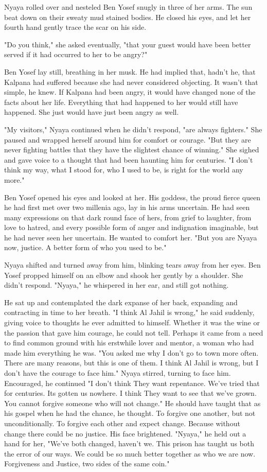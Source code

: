 \documentclass{amsart}
\begin{document}
Nyaya rolled over and nesteled Ben Yosef snugly in three of her arms. The sun beat down on their sweaty mud stained bodies. He closed his eyes, and let her fourth hand gently trace the scar on his side.

"Do you think," she asked eventually, "that your guest would have been better served if it had occurred to her to be angry?" 

Ben Yosef lay still, breathing in her musk. He had implied that, hadn't he, that Kalpana had suffered because she had never considered objecting. It wasn't that simple, he knew. If Kalpana had been angry, it would have changed none of the facts about her life. Everything that had happened to her would still have happened. She just would have just been angry as well.

"My visitors," Nyaya continued when he didn't respond, "are always fighters." She paused and wrapped herself around him for comfort or courage. "But they are never fighting battles that they have the slightest chance of winning." She sighed and gave voice to a thought that had been haunting him for centuries. "I don't think my way, what I stood for, who I used to be, is right for the world any more."

Ben Yosef opened his eyes and looked at her. His goddess, the proud fierce queen he had first met over two millenia ago, lay in his arms uncertain. He had seen many expressions on that dark round face of hers, from grief to laughter, from love to hatred, and every possible form of anger and indignation imaginable, but he had never seen her uncertain. He wanted to comfort her. "But you are Nyaya now, justice. A better form of who you used to be." 

Nyaya shifted and turned away from him, blinking tears away from her eyes. Ben Yosef propped himself on an elbow and shook her gently by a shoulder. She didn't respond. "Nyaya," he whispered in her ear, and still got nothing. 

He sat up and contemplated the dark expanse of her back, expanding and contracting in time to her breath. "I think Al Jahil is wrong," he said suddenly, giving voice to thoughts he ever admitted to himself. Whether it was the wine or the passion that gave him courage, he could not tell. Perhaps it came from a need to find common ground with his erstwhile lover and mentor, a woman who had made him everything he was. "You asked me why I don't go to town more often. There are many reasons, but this is one of them. I think Al Jahil is wrong, but I don't have the courage to face him." Nyaya stirred, turning to face him. Encouraged, he continued "I don't think They want repentance. We've tried that for centuries. Its gotten us nowhere. I think They want to see that we've grown. You cannot forgive someone who will not change." He should have taught that as his gospel when he had the chance, he thought. To forgive one another, but not unconditionally. To forgive each other and expect change. Because without change there could be no justice. His face brightened. "Nyaya," he held out a hand for her, "We've both changed, haven't we. This prison has taught us both the error of our ways. We could be so much better together as who we are now. Forgiveness and Justice, two sides of the same coin." 
\end{document}
